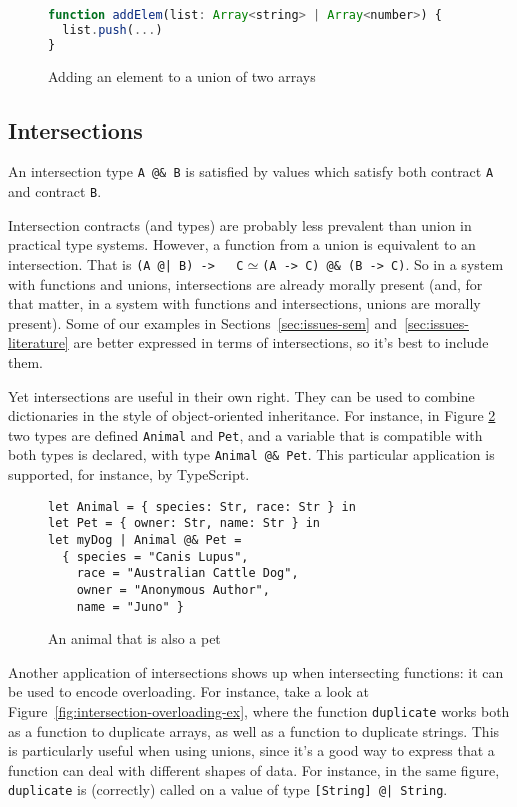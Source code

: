 \documentclass[sigplan,10pt,review,anonymous]{acmart}
\newcommand{\nickel}[1]{\lstinline[language=nickel]{#1}}
\begin{document}
\begin{figure}[h]
\begin{lstlisting}[language=JavaScript]
function addElem(list: Array<string> | Array<number>) {
  list.push(...)
}
\end{lstlisting}
\caption{Adding an element to a union of two arrays}
\label{fig:addElem}
\end{figure}



\subsection{Intersections}

An intersection type \nickel{A @& B} is satisfied by values which
satisfy both contract \nickel{A} and contract \nickel{B}.

Intersection contracts (and types) are probably less prevalent than
union in practical type systems. However, a function from a union is
equivalent to an intersection. That is \nickel{(A @| B) ->
  C}$\simeq$\nickel{(A -> C) @& (B -> C)}. So in a system with
functions and unions, intersections are already morally present (and,
for that matter, in a system with functions and intersections, unions
are morally present). Some
of our examples in Sections~\ref{sec:issues-sem}
and~\ref{sec:issues-literature} are better expressed in terms of
intersections, so it's best to include them.

Yet intersections are useful in their own right. They can be used to
combine dictionaries in the style of object-oriented inheritance. For instance, in
Figure \ref{fig:intersection-record} two types are defined
\nickel{Animal} and \nickel{Pet}, and a variable that is compatible
with both types is declared, with type \nickel{Animal @& Pet}. This
particular application is supported, for instance, by TypeScript.

\begin{figure}[h]
\begin{lstlisting}[language=nickel]
let Animal = { species: Str, race: Str } in
let Pet = { owner: Str, name: Str } in
let myDog | Animal @& Pet =
  { species = "Canis Lupus",
    race = "Australian Cattle Dog",
    owner = "Anonymous Author",
    name = "Juno" }
\end{lstlisting}
\caption{An animal that is also a pet}
\label{fig:intersection-record}
\end{figure}

Another application of intersections shows up when intersecting
functions: it can be used to encode overloading.
For instance, take a look at Figure~\ref{fig:intersection-overloading-ex}, where the function
\nickel{duplicate} works both as a function to duplicate
arrays, as well as a function to duplicate strings.
This is particularly useful when using unions, since it's a
good way to express that a function can deal with different
shapes of data.
For instance, in the same figure, \nickel{duplicate} is (correctly) called
on a value of type \nickel{[String] @| String}.
\end{document}
